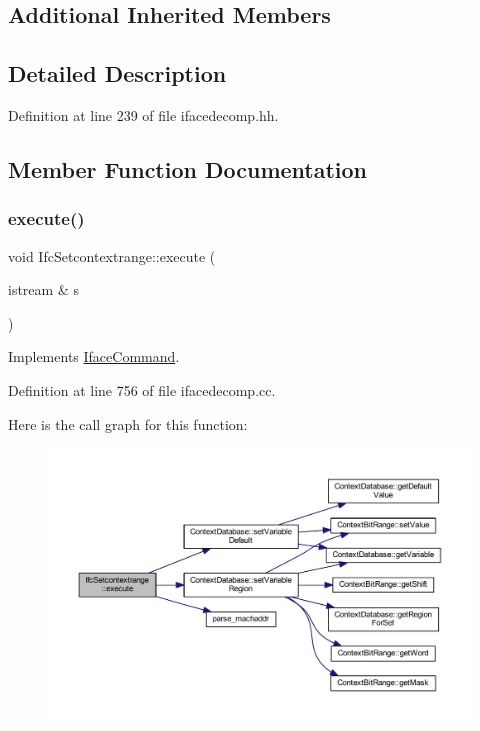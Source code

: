 \subsection*{Additional Inherited Members}


\subsection{Detailed Description}


Definition at line 239 of file ifacedecomp.\+hh.



\subsection{Member Function Documentation}
\mbox{\label{class_ifc_setcontextrange_aa24fec02de28b15d6e7a85d25567f52c}} 
\subsubsection{\texorpdfstring{execute()}{execute()}}
{\footnotesize\ttfamily void Ifc\+Setcontextrange\+::execute (\begin{DoxyParamCaption}\item[{istream \&}]{s }\end{DoxyParamCaption})\hspace{0.3cm}{\ttfamily [virtual]}}



Implements \mbox{\hyperlink{class_iface_command_af10e29cee2c8e419de6efe9e680ad201}{Iface\+Command}}.



Definition at line 756 of file ifacedecomp.\+cc.

Here is the call graph for this function\+:
\nopagebreak
\begin{figure}[H]
\begin{center}
\leavevmode
\includegraphics[width=350pt]{class_ifc_setcontextrange_aa24fec02de28b15d6e7a85d25567f52c_cgraph}
\end{center}
\end{figure}


